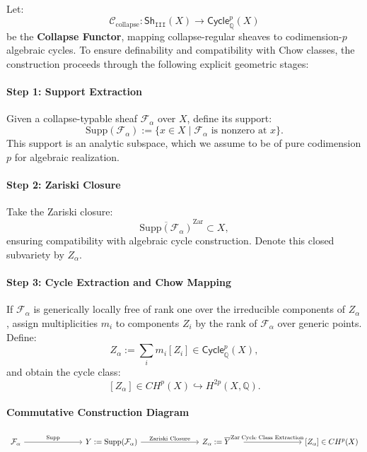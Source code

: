 \documentclass[11pt]{article}
\begin{document}
Let:
\[
\mathcal{C}_{\text{collapse}} : \mathsf{Sh}_{\texttt{III}}(X) \longrightarrow \mathsf{Cycle}^p_\mathbb{Q}(X)
\]
be the \textbf{Collapse Functor}, mapping collapse-regular sheaves to codimension-$p$ algebraic cycles. To ensure definability and compatibility with Chow classes, the construction proceeds through the following explicit geometric stages:

\paragraph{Step 1: Support Extraction}

Given a collapse-typable sheaf $\mathcal{F}_\alpha$ over $X$, define its support:
\[
\mathrm{Supp}(\mathcal{F}_\alpha) := \{ x \in X \mid \mathcal{F}_\alpha \text{ is nonzero at } x \}.
\]
This support is an analytic subspace, which we assume to be of pure codimension $p$ for algebraic realization.

\paragraph{Step 2: Zariski Closure}

Take the Zariski closure:
\[
\overline{\mathrm{Supp}(\mathcal{F}_\alpha)}^{\mathrm{Zar}} \subset X,
\]
ensuring compatibility with algebraic cycle construction. Denote this closed subvariety by $Z_\alpha$.

\paragraph{Step 3: Cycle Extraction and Chow Mapping}

If $\mathcal{F}_\alpha$ is generically locally free of rank one over the irreducible components of $Z_\alpha$, assign multiplicities $m_i$ to components $Z_i$ by the rank of $\mathcal{F}_\alpha$ over generic points. Define:
\[
Z_\alpha := \sum_i m_i [Z_i] \in \mathsf{Cycle}^p_\mathbb{Q}(X),
\]
and obtain the cycle class:
\[
[Z_\alpha] \in CH^p(X) \hookrightarrow H^{2p}(X, \mathbb{Q}).
\]

\paragraph{Commutative Construction Diagram}

\[
\begin{tikzcd}[row sep=4em, column sep=7.5em]
\mathcal{F}_\alpha 
  \arrow[r, "{\mathrm{Supp}}"] 
& {Y := \mathrm{Supp}(\mathcal{F}_\alpha)} 
  \arrow[r, "{\text{Zariski Closure}}"] 
& {Z_\alpha := \overline{Y}^{\mathrm{Zar}}} 
  \arrow[r, "{\text{Cycle Class Extraction}}"] 
& {[Z_\alpha] \in CH^p(X)}
\end{tikzcd}
\]
\end{document}
